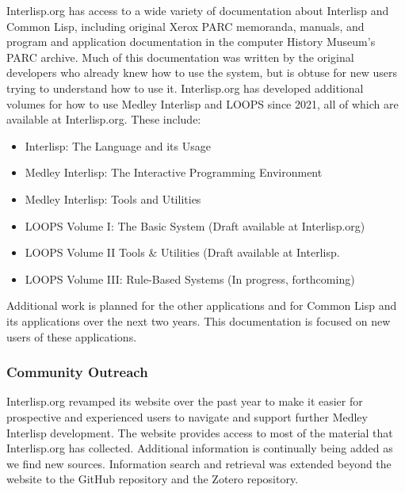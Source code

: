 \documentclass[sigconf]{acmart}
\begin{document}
Interlisp.org has access to a wide variety of documentation about Interlisp and Common Lisp, including original Xerox PARC memoranda, manuals, and program and application documentation in the computer History Museum's PARC archive. Much of this documentation was written by the original developers who already knew how to use the system, but is obtuse for new users trying to understand how to use it. Interlisp.org has developed additional volumes for how to use Medley Interlisp and LOOPS since 2021, all of which are available at Interlisp.org. These include:

\begin{itemize}
    \item Interlisp: The Language and its Usage
    \item Medley Interlisp: The Interactive Programming Environment
    \item Medley Interlisp: Tools and Utilities
    \item LOOPS Volume I: The Basic System (Draft available at Interlisp.org)
    \item LOOPS Volume II Tools \& Utilities (Draft available at Interlisp.
    \item LOOPS Volume III: Rule-Based Systems (In progress, forthcoming)
\end{itemize}
    
Additional work is planned for the other applications and for Common Lisp and its applications over the next two years. This documentation is focused on new users of these applications. 

\subsubsection{Community Outreach}

Interlisp.org revamped its website over the past year to make it easier for prospective and experienced users to navigate and support further Medley Interlisp development. The website provides access to most of the material that Interlisp.org has collected. Additional information is continually being added as we find new sources. Information search and retrieval was extended beyond the website to the GitHub repository and the Zotero repository.


\end{document}
